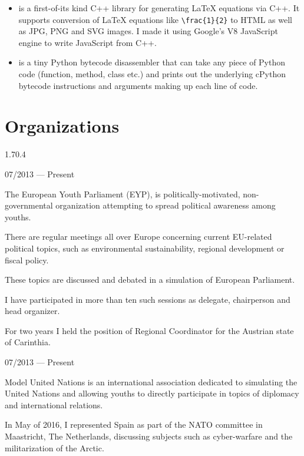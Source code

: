 \begin{itemize}
  \item {} is a first-of-its kind C++ library for generating LaTeX equations via C++. It supports conversion of LaTeX equations like \texttt{\textbackslash frac\{1\}\{2\}} to HTML as well as JPG, PNG and SVG images. I made it using Google's V8 JavaScript engine to write JavaScript from C++.
  \item {} is a tiny Python bytecode disassembler that can take any piece of Python code (function, method, class etc.) and prints out the underlying cPython bytecode instructions and arguments making up each line of code.
\end{itemize}

\section{Organizations}{1.7}{0.4}
\begin{entry}{}{}{07/2013 --- Present}
  \item The European Youth Parliament (EYP), is politically-motivated, non-governmental organization attempting to spread political awareness among youths.
  \item There are regular meetings all over Europe concerning current EU-related political topics, such as environmental sustainability, regional development or fiscal policy.
  \item These topics are discussed and debated in a simulation of European Parliament.
  \item I have participated in more than ten such sessions as delegate, chairperson and head organizer.
  \item For two years I held the position of Regional Coordinator for the Austrian state of Carinthia.
\end{entry}
\begin{entry}{}{}{07/2013 --- Present}
  \item Model United Nations is an international association dedicated to simulating the United Nations and allowing youths to directly participate in topics of diplomacy and international relations.
  \item In May of 2016, I represented Spain as part of the NATO committee in Maastricht, The Netherlands, discussing subjects such as cyber-warfare and the militarization of the Arctic.
\end{entry}
